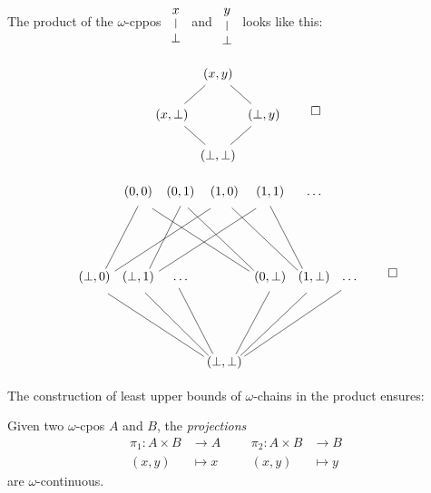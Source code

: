 \begin{example}
  The product of the \(\omega\)-cppos %
  \(\begin{tikzcd}[row sep=8pt]
    x \\
    \bot \ar[u, no head]
  \end{tikzcd}\)
  and \( \begin{tikzcd}[row sep=8pt]
    y \\
    \bot \ar[u, no head]
  \end{tikzcd}
  \) looks like this:

  \[
    \begin{tikzcd}[row sep=15pt,column sep=1pt]
      & (x,y) \\
      (x,\bot) \ar[ur, no head]& & (\bot,y) \ar[ul, no head] \\
      & (\bot,\bot) \ar[ur,no head] \ar[ul, no head]
    \end{tikzcd}\qedhere
  \]
\end{example}

\begin{example}
  \[
    \begin{tikzcd}[column sep=1pt, row sep=50pt]
      & (0,0) & (0,1) & (1,0) & (1,1) & \dots \\
      (\bot,0) \ar[ur, no head, shift right=5pt]
      \ar[urrr, no head, shift right=5pt]
      & (\bot,1)
      \ar[ur, no head, shift right=5pt]
      \ar[urrr, no head, shift right=5pt]
      & \dots
      &
      & (0,\bot)
      \ar[ulll, no head, shift left=5pt]
      \ar[ull, no head, shift left=5pt]
      & (1,\bot)
      \ar[ull, no head, shift left=5pt]
      \ar[ul, no head, shift left=5pt]
      & \dots \\
      & & & (\bot,\bot)
      \ar[ulll,no head, shift left=5pt] \ar[ull, no head, shift left=5pt]
      \ar[ul, no head, shift left=5pt] \ar[ur, no head, shift right=5pt]
      \ar[urr, no head, shift right=5pt] \ar[urrr, no head, shift right=5pt]
    \end{tikzcd}\qedhere
  \]
\end{example}

The construction of least upper bounds of \(\omega\)-chains in the product
ensures:
\begin{lemma}\label{projections}
  Given two \(\omega\)-cpos \(A\) and \(B\), the \emph{projections}
  \begin{align*}
    \pi_1 \colon A \times B &\to A &&& \pi_2 \colon A \times B &\to B \\
    (x,y) &\mapsto x &&& (x,y) &\mapsto y
  \end{align*}
  are \(\omega\)-continuous.
\end{lemma}

